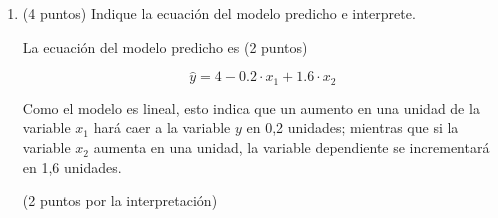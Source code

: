\documentclass[10pt,a4paper]{article}
\begin{document}
\begin{enumerate}
\begin{enumerate}
        {\color{blue} Sabemos que los estimadores de mínimos cuadrados ordinarios (MCO) están dados por:
    
        \[
        \hat{\beta} = (X'X)^{-1} X'Y
        \]
    
        Calculando los estimadores (2 puntos por plantear):
    
        \[
        \hat{\beta} = \begin{pmatrix}
        33 & 0 & 0 \\
        0 & 40 & 20 \\
        0 & 20 & 60
        \end{pmatrix}^{-1}
        \begin{pmatrix}
        132 \\
        24 \\
        92
        \end{pmatrix}
        \]

        (2 puntos por calcular la inversa)
        \[
        \hat{\beta} = \begin{pmatrix}
        \frac{1}{33} & 0 & 0 \\
        0 & 0.03 & -0.01 \\
        0 & -0.01 & 0.02
        \end{pmatrix}
        \begin{pmatrix}
        132 \\
        24 \\
        92
        \end{pmatrix}
        \]

        (2 puntos por llegar al vector)
        \[
        \hat{\beta} = \begin{pmatrix}
        4 \\
        -0.2 \\
        1.6
        \end{pmatrix}
        \]
        
        Así que los estimadores son (1 punto por cada estimador indicado):
        
        \[
        \hat{\beta_0} = 4, \quad \hat{\beta_1} = -0.2, \quad \hat{\beta_2} = 1.6
        \]}
        \item (4 puntos) Indique la ecuación del modelo predicho e interprete.

        {\color{blue} La ecuación del modelo predicho es (2 puntos)

        $$\hat{y} = 4 - 0.2 \cdot x_1 + 1.6 \cdot x_2$$

        Como el modelo es lineal, esto indica que un aumento en una unidad de la variable $x_1$ hará caer a la variable $y$ en 0,2 unidades; mientras que si la variable $x_2$ aumenta en una unidad, la variable dependiente se incrementará en 1,6 unidades.} (2 puntos por la interpretación)\\
        

\end{enumerate}
\end{enumerate}
\end{document}

